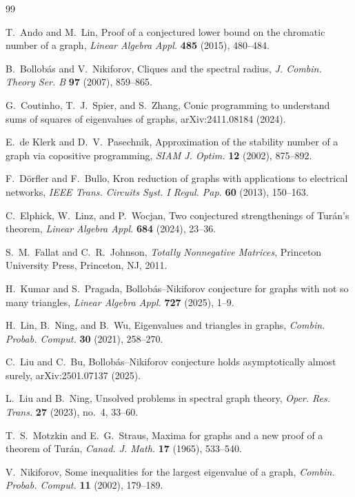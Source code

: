 \documentclass[11pt]{article}
\theoremstyle{remark}
\begin{document}
\begin{thebibliography}{99}

T.~Ando and M.~Lin,
Proof of a conjectured lower bound on the chromatic number of a graph,
\emph{Linear Algebra Appl.} \textbf{485} (2015), 480--484.

B.~Bollob\'as and V.~Nikiforov,
Cliques and the spectral radius,
\emph{J. Combin. Theory Ser. B} \textbf{97} (2007), 859--865.

G.~Coutinho, T.~J.~Spier, and S.~Zhang,
Conic programming to understand sums of squares of eigenvalues of graphs,
arXiv:2411.08184 (2024).

E.~de Klerk and D.~V.~Pasechnik,
Approximation of the stability number of a graph via copositive programming,
\emph{SIAM J. Optim.} \textbf{12} (2002), 875--892.

F.~D\"orfler and F.~Bullo,
Kron reduction of graphs with applications to electrical networks,
\emph{IEEE Trans. Circuits Syst. I Regul. Pap.} \textbf{60} (2013), 150--163.

C.~Elphick, W.~Linz, and P.~Wocjan,
Two conjectured strengthenings of Tur\'an's theorem,
\emph{Linear Algebra Appl.} \textbf{684} (2024), 23--36.

S.~M.~Fallat and C.~R.~Johnson,
\emph{Totally Nonnegative Matrices},
Princeton University Press, Princeton, NJ, 2011.

H.~Kumar and S.~Pragada,
Bollob\'as--Nikiforov conjecture for graphs with not so many triangles,
\emph{Linear Algebra Appl.} \textbf{727} (2025), 1--9.

H.~Lin, B.~Ning, and B.~Wu,
Eigenvalues and triangles in graphs,
\emph{Combin. Probab. Comput.} \textbf{30} (2021), 258--270.

C.~Liu and C.~Bu,
Bollob\'as--Nikiforov conjecture holds asymptotically almost surely,
arXiv:2501.07137 (2025).

L.~Liu and B.~Ning,
Unsolved problems in spectral graph theory,
\emph{Oper. Res. Trans.} \textbf{27} (2023), no.~4, 33--60.

T.~S.~Motzkin and E.~G.~Straus,
Maxima for graphs and a new proof of a theorem of Tur\'an,
\emph{Canad. J. Math.} \textbf{17} (1965), 533--540.

V.~Nikiforov,
Some inequalities for the largest eigenvalue of a graph,
\emph{Combin. Probab. Comput.} \textbf{11} (2002), 179--189.


\end{thebibliography}
\end{document}
